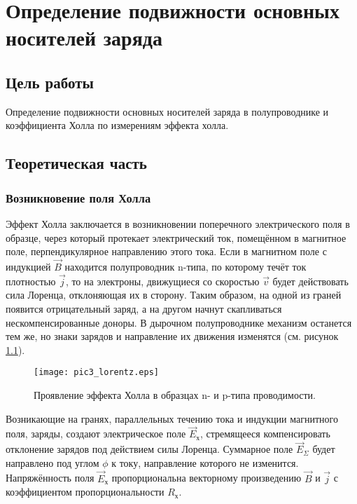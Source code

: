 \chapter{Определение подвижности основных носителей заряда}

\section{Цель работы}
Определение подвижности основных носителей заряда в полупроводнике и коэффициента Холла по измерениям эффекта холла.

\section{Теоретическая часть}
\subsection{Возникновение поля Холла}

Эффект Холла заключается в возникновении поперечного электрического поля в образце, через который протекает электрический ток, помещённом в магнитное поле, перпендикулярное направлению этого тока. Если в магнитном поле с индукцией $\overrightarrow{B}$ находится полупроводник n-типа, по которому течёт ток плотностью $\overrightarrow{j}$, то на электроны, движущиеся со скоростью $\overrightarrow{v}$ будет действовать сила Лоренца, отклоняющая их в сторону. Таким образом, на одной из граней появится отрицательный заряд, а на другом начнут скапливаться нескомпенсированные доноры. В дырочном полупроводнике механизм останется тем же, но знаки зарядов и направление их движения изменятся (см. рисунок \ref{pic3_lorentz}).

\begin{figure}[h!]\centering
\texttt{[image: pic3\_lorentz.eps]}
\caption{Проявление эффекта Холла в образцах n- и p-типа проводимости.}
\label{pic3_lorentz}
\end{figure}

Возникающие на гранях, параллельных течению тока и индукции магнитного поля, заряды, создают электрическое поле $\overrightarrow{E}_{\text{х}}$, стремящееся компенсировать отклонение зарядов под действием силы Лоренца. Суммарное поле $\overrightarrow{E}_{\Sigma}$ будет направлено под углом $\phi$ к току, направление которого не изменится. Напряжённость поля $\overrightarrow{E}_{\text{х}}$ пропорциональна векторному произведению $\overrightarrow{B}$ и $\overrightarrow{j}$ с коэффициентом пропорциональности $R_{\text{х}}$.

